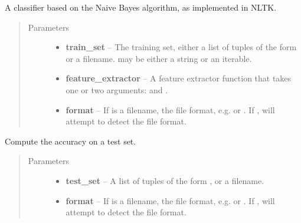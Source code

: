 \documentclass[letterpaper,10pt,english]{sphinxmanual}
\begin{document}
\begin{fulllineitems}
\label{api_reference:textblob.classifiers.NaiveBayesClassifier}
A classifier based on the Naive Bayes algorithm, as implemented in
NLTK.
\begin{quote}\begin{description}
\item[{Parameters}] \leavevmode\begin{itemize}
\item {} 
\textbf{train\_set} -- The training set, either a list of tuples of the form
 or a filename.  may be either
a string or an iterable.

\item {} 
\textbf{feature\_extractor} -- A feature extractor function that takes one or
two arguments:  and .

\item {} 
\textbf{format} -- If  is a filename, the file format, e.g.
 or . If , will attempt to detect the
file format.

\end{itemize}

\end{description}\end{quote}


\begin{fulllineitems}
\label{api_reference:textblob.classifiers.NaiveBayesClassifier.accuracy}
Compute the accuracy on a test set.
\begin{quote}\begin{description}
\item[{Parameters}] \leavevmode\begin{itemize}
\item {} 
\textbf{test\_set} -- A list of tuples of the form , or a
filename.

\item {} 
\textbf{format} -- If  is a filename, the file format, e.g.
 or . If , will attempt to detect the
file format.


\end{itemize}
\end{description}
\end{quote}
\end{fulllineitems}
\end{fulllineitems}
\end{document}
